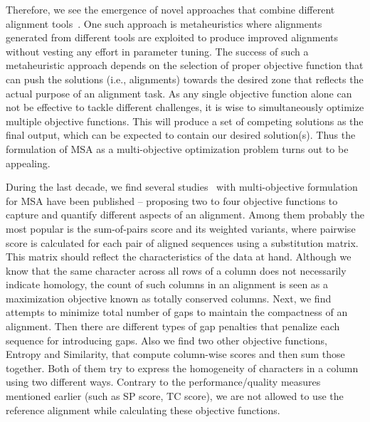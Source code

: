 Therefore, we see the emergence of novel approaches that combine different alignment tools~\citep{thompson2011comprehensive}. One such approach is metaheuristics where alignments generated from different tools are exploited to produce improved alignments without vesting any effort in parameter tuning. The success of such a metaheuristic approach depends on the selection of proper objective function that can push the solutions (i.e., alignments) towards the desired zone that reflects the actual purpose of an alignment task. As any single objective function alone can not be effective to tackle different challenges, it is wise to simultaneously optimize multiple objective functions. This will produce a set of competing solutions as the final output, which can be expected to contain our desired solution(s). Thus the formulation of MSA as a multi-objective optimization problem turns out to be appealing.

During the last decade, we find several studies~\citep{da2010alineaga, ortuno2013optimizing, soto2014multi, abbasi2015local, zhu2016novel, rani2016multiple, rubio2016hybrid,zambrano2017comparing} with multi-objective formulation for MSA have been published -- proposing two to four objective functions to capture and quantify different aspects of an alignment. Among them probably the most popular is the sum-of-pairs score and its weighted variants, where pairwise score is calculated for each pair of aligned sequences using a substitution matrix. This matrix should reflect the characteristics of the data at hand. Although we know that the same character across all rows of a column does not necessarily indicate homology, the count of such columns in an alignment is seen as a maximization objective known as totally conserved columns. Next, we find attempts to minimize total number of gaps to maintain the compactness of an alignment. Then there are different types of gap penalties that penalize each sequence for introducing gaps. Also we find two other objective functions, Entropy and Similarity, that compute column-wise scores and then sum those together. Both of them try to express the homogeneity of characters in a column using two different ways. Contrary to the performance/quality measures mentioned earlier (such as SP score, TC score), we are not allowed to use the reference alignment while calculating these objective functions. 

